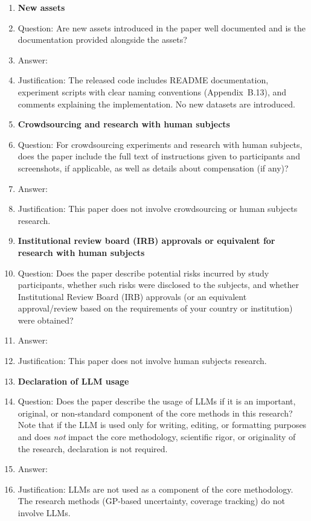 \begin{enumerate}
\item {\bf New assets}
    \item[] Question: Are new assets introduced in the paper well documented and is the documentation provided alongside the assets?
    \item[] Answer: \answerYes{}
    \item[] Justification: The released code includes README documentation, experiment scripts with clear naming conventions (Appendix~B.13), and comments explaining the implementation. No new datasets are introduced.

\item {\bf Crowdsourcing and research with human subjects}
    \item[] Question: For crowdsourcing experiments and research with human subjects, does the paper include the full text of instructions given to participants and screenshots, if applicable, as well as details about compensation (if any)?
    \item[] Answer: \answerNA{}
    \item[] Justification: This paper does not involve crowdsourcing or human subjects research.

\item {\bf Institutional review board (IRB) approvals or equivalent for research with human subjects}
    \item[] Question: Does the paper describe potential risks incurred by study participants, whether such risks were disclosed to the subjects, and whether Institutional Review Board (IRB) approvals (or an equivalent approval/review based on the requirements of your country or institution) were obtained?
    \item[] Answer: \answerNA{}
    \item[] Justification: This paper does not involve human subjects research.

\item {\bf Declaration of LLM usage}
    \item[] Question: Does the paper describe the usage of LLMs if it is an important, original, or non-standard component of the core methods in this research? Note that if the LLM is used only for writing, editing, or formatting purposes and does \emph{not} impact the core methodology, scientific rigor, or originality of the research, declaration is not required.
    \item[] Answer: \answerNA{}
    \item[] Justification: LLMs are not used as a component of the core methodology. The research methods (GP-based uncertainty, coverage tracking) do not involve LLMs.

\end{enumerate}
